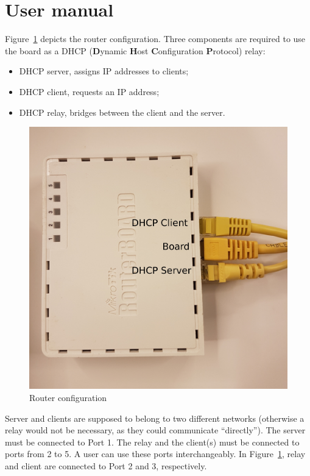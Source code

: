 \section{User manual}
Figure~\ref{fig:router} depicts the router configuration. Three components are required to use the board as a DHCP (\textbf{D}ynamic \textbf{H}ost \textbf{C}onfiguration \textbf{P}rotocol) relay:
\begin{itemize}
	\item DHCP server, assigns IP addresses to clients;
	\item DHCP client, requests an IP address;
	\item DHCP relay, bridges between the client and the server.
\end{itemize}

\begin{figure}[h]
	\centering
	\includegraphics[scale=0.1]{images/router}
	\caption{Router configuration}
	\label{fig:router}
\end{figure}

Server and clients are supposed to belong to two different networks (otherwise a relay would not be necessary, as they could communicate ``directly''). The server must be connected to Port 1. The relay and the client(s) must be connected to ports from 2 to 5. A user can use these ports interchangeably. In Figure~\ref{fig:router}, relay and client are connected to Port 2 and 3, respectively. 

